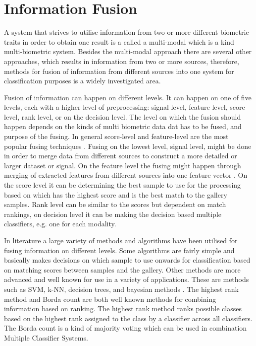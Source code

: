 \section{Information Fusion}

A system that strives to utilise information from two or more different biometric traits in order to obtain one result is a called a multi-modal which is a kind multi-biometric system. Besides the multi-modal approach there are several other approaches, which results in information from two or more sources, therefore, methods for fusion of information from different sources into one system for classification purposes is a widely investigated area. \citep{Bowyer2016b} 

Fusion of information can happen on different levels. It can happen on one of five levels, each with a higher level of preprocessing: signal level, feature level, score level, rank level, or on the decision level. The level on which the fusion should happen depends on the kinds of multi biometric data dat has to be fused, and purpose of the fusing. In general score-level and feature-level are the most popular fusing techniques \citep{Bowyer2016b}. Fusing on the lowest level, signal level, might be done in order to merge data from different sources to construct a more detailed or larger dataset or signal. On the feature level the fusing might happen through merging of extracted features from different sources into one feature vector \citep{Ross2003}. On the score level it can be determining the best sample to use for the processing based on which has the highest score and is the best match to the gallery samples. Rank level can be similar to the scores but dependent on match rankings, on decision level it can be making the decision based multiple classifiers, e.g. one for each modality\citep{Fierrez2018b}.

In literature a large variety of methods and algorithms have been utilised for fusing information on different levels. Some algorithms are fairly simple and basically makes decisions on which sample to use onwards for classification based on matching scores between samples and the gallery. Other methods are more advanced and well known for use in a variety of applications. These are methods such as SVM, k-NN, decision trees, and bayesian methods \citep{Ross2003}. The highest rank method and Borda count are both well known methods for combining information based on ranking. The highest rank method ranks possible classes based on the highest rank assigned to the class by a classifier across all classifiers.\citep{Ho1994} The Borda count is a kind of majority voting which can be used in combination Multiple Classifier Systems\citep{Bowyer2016b,Ho1994}.  

